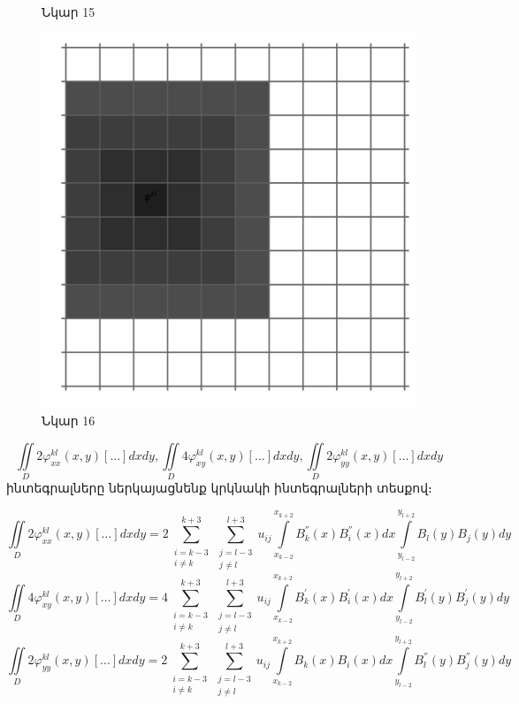 \documentclass[fleqn, bachelor,subf,12pt,notitlepage]{article}
\begin{document}
\begin{figure}[h!]
\begin{minipage}[b]{0.2\textwidth}
    \caption{Նկար 15}
  \end{minipage}
\hfill
  \begin{minipage}[b]{0.2\textwidth}
    \includegraphics[width=\textwidth]{images/two_dimensional_basis_intersection_edge_2}
    \caption{Նկար 16}
  \end{minipage}

\end{figure}

		$$\iint \limits_{D} 2\varphi_{xx}^{kl}(x,y)[\dots]dxdy, \iint \limits_{D} 4\varphi_{xy}^{kl}(x,y)[\dots]dxdy, \iint \limits_{D} 2\varphi_{yy}^{kl}(x,y)[\dots]dxdy$$
\noindent ինտեգրալները ներկայացնենք կրկնակի ինտեգրալների տեսքով։

$$\iint \limits_{D} 2\varphi_{xx}^{kl}(x,y)[\dots]dxdy= 2\sum_{\substack{i=k-3\\ i \neq k}}^{k+3}\sum_{\substack{j=l-3\\ j \neq l}}^{l+3} u_{ij}\int \limits_{x_{k-2}}^{x_{k+2}}B_{k}^{''}(x)B_{i}^{''}(x)dx \int \limits_{y_{l-2}}^{y_{l+2}}B_{l}(y)B_{j}(y)dy$$
$$\iint \limits_{D} 4\varphi_{xy}^{kl}(x,y)[\dots]dxdy= 4\sum_{\substack{i=k-3\\ i \neq k}}^{k+3}\sum_{\substack{j=l-3\\ j \neq l}}^{l+3}u_{ij}\int \limits_{x_{k-2}}^{x_{k+2}}B_{k}^{'}(x)B_{i}^{'}(x)dx \int \limits_{y_{l-2}}^{y_{l+2}}B_{l}^{'}(y)B_{j}^{'}(y)dy$$
$$\iint \limits_{D} 2\varphi_{yy}^{kl}(x,y)[\dots]dxdy= 2\sum_{\substack{i=k-3\\ i \neq k}}^{k+3}\sum_{\substack{j=l-3\\ j \neq l}}^{l+3}u_{ij}\int \limits_{x_{k-2}}^{x_{k+2}}B_{k}(x)B_{i}(x)dx \int \limits_{y_{l-2}}^{y_{l+2}}B_{l}^{''}(y)B_{j}^{''}(y)dy$$
\end{document}
